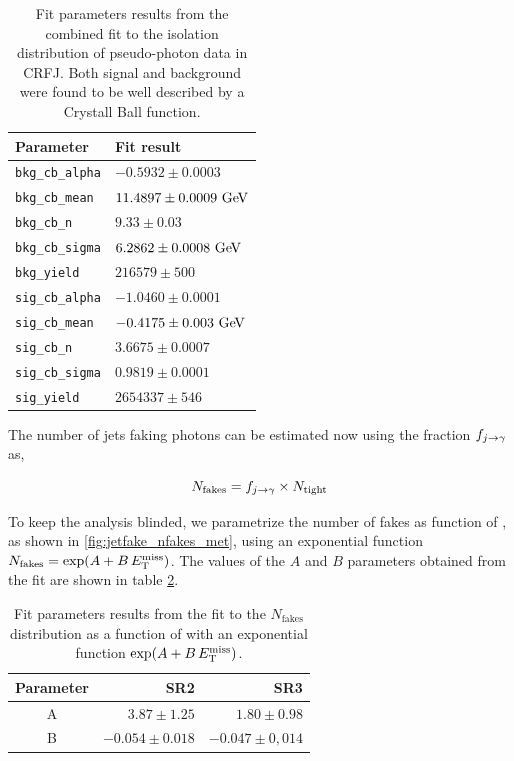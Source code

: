 \begin{table}[h!]
  \centering
  \caption{Fit parameters results from the combined fit to the isolation distribution of pseudo-photon data in CRFJ. Both signal and background were found to be well described by a Crystall Ball function.}
  \begin{tabular}{l l}
     Parameter &  Fit result \\
     \hline
     \verb|bkg_cb_alpha| & $-0.5932 \pm 0.0003$ \\
     \verb|bkg_cb_mean|  & $11.4897 \pm 0.0009 \GeV$ \\
     \verb|bkg_cb_n|     & $9.33 \pm 0.03$ \\
     \verb|bkg_cb_sigma| & $6.2862 \pm 0.0008 \GeV$ \\
     \verb|bkg_yield|    & $216579 \pm 500$ \\
     \hline
     \verb|sig_cb_alpha| & $-1.0460 \pm 0.0001$ \\
     \verb|sig_cb_mean|  & $-0.4175 \pm 0.003 \GeV$ \\
     \verb|sig_cb_n|     & $3.6675 \pm 0.0007$ \\
     \verb|sig_cb_sigma| & $0.9819 \pm 0.0001$ \\
     \verb|sig_yield|    & $2654337 \pm 546$ \\
     \hline
   \end{tabular}
    \label{tab:jetfake_fit_pars}
\end{table}


The number of jets faking photons can be estimated now using the fraction $f_{j\rightarrow\gamma}$ as,

\begin{equation}\label{eq:njfakes}
  N_\text{fakes} = f_{j\rightarrow\gamma} \times N_\text{tight}
\end{equation}

To keep the analysis blinded, we parametrize the number of fakes as function of \met, as shown in \cref{fig:jetfake_nfakes_met}, using an exponential
function $N_\text{fakes} = \exp(A+B \, E_{\mathrm{T}}^{\mathrm{miss}})$. The values of the $A$ and $B$ parameters obtained from the fit are shown in table \cref{tab:exppars}.

\begin{table}[h!]
  \centering
  \caption{Fit parameters results from the fit to the $N_\text{fakes}$ distribution as a function of \met with an exponential function $\exp(A+B\, E_{\mathrm{T}}^{\mathrm{miss}})$.}
  \begin{tabular}{crr}
    \hline
    Parameter &  SR2 & SR3 \\
     \hline
     A & $3.87 \pm 1.25$  &  $1.80 \pm 0.98$ \\
     B &  $-0.054 \pm 0.018$  & $-0.047 \pm 0,014$ \\
     \hline
  \end{tabular}
  \label{tab:exppars}
\end{table}


